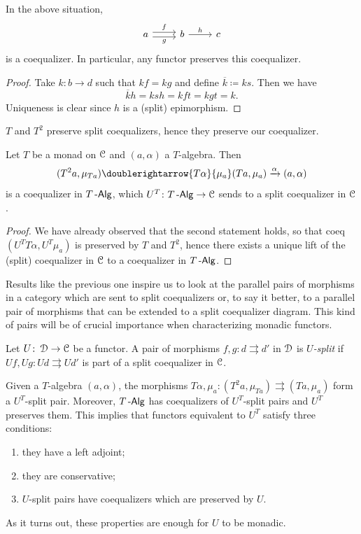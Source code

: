 \documentclass[a4paper,11pt,oneside,openany]{scrbook}
\begin{document}
\begin{prop}
	In the above situation,
	\[
		\begin{tikzcd}[ampersand replacement=\&]
			a\arrow[r, shift left, "f"] \arrow[r, shift right, "g"']
			\& b \arrow[r, "h"] \& c
		\end{tikzcd}
	\] is a coequalizer. In particular, any functor preserves this coequalizer.
\end{prop}
\begin{proof}
	Take $k\colon b\to d$ such that $kf=kg$ and define $\overline{k}\coloneqq ks$. Then we have
	$$\overline{k}h=ksh=kft=kgt=k.$$
	Uniqueness is clear since $h$ is a (split) epimorphism.
\end{proof}
$T$ and $T^2$ preserve split coequalizers, hence they preserve our coequalizer.
\begin{cor}
	Let $T$ be a monad on $\operatorname{\mathcal{C}}$ and $(a,\alpha)$ a $T$-algebra. Then
	\[
		(T^2a,\mu_{Ta}) \doublerightarrow{T\alpha}{\mu_a}(Ta,\mu_a)\xrightarrow{\alpha}(a,\alpha)
	\]
	is a coequalizer in $T\operatorname{-\mathsf{Alg}}$, which $U^T\colon T\operatorname{-\mathsf{Alg}}\to\operatorname{\mathcal{C}}$ sends to a split coequalizer in $\operatorname{\mathcal{C}}$.
\end{cor}
\begin{proof}
	We have already observed that the second statement holds, so that
	coeq$(U^TT\alpha, U^T\mu_a)$ is preserved by $T$ and $T^2$, hence there
	exists a unique lift of the (split) coequalizer in $\operatorname{\mathcal{C}}$ to a coequalizer in
	$T\operatorname{-\mathsf{Alg}}$.
\end{proof}
Results like the previous one inspire us to look at the parallel pairs of
morphisms in a category which are sent to split coequalizers or, to say it
better, to a parallel pair of morphisms that can be extended to a split
coequalizer diagram. This kind of pairs will be of crucial importance when
characterizing monadic functors.
\begin{defn}
	Let $U\colon\operatorname{\mathcal{D}}\to\operatorname{\mathcal{C}}$ be a functor. A pair of morphisms $f,g\colon d\rightrightarrows d'$ in $\operatorname{\mathcal{D}}$ is \emph{$U$-split} if $Uf,Ug\colon Ud\rightrightarrows Ud'$ is part of a split coequalizer in $\operatorname{\mathcal{C}}$.
\end{defn}
\begin{rmk}
	Given a $T$-algebra $(a,\alpha)$, the morphisms
	$T\alpha,\mu_a\colon(T^2a,\mu_{Ta})\rightrightarrows(Ta,\mu_a)$ form a
	$U^T$-split pair. Moreover, $T\operatorname{-\mathsf{Alg}}$ has coequalizers of $U^T$-split pairs
	and $U^T$ preserves them. This implies that functors equivalent to $U^T$
	satisfy three conditions:
	\begin{enumerate}
		\item they have a left adjoint;
		\item they are conservative;
		\item $U$-split pairs have coequalizers which are preserved by $U$.
	\end{enumerate}
	As it turns out, these properties are enough for $U$ to be monadic.
\end{rmk}
\end{document}
